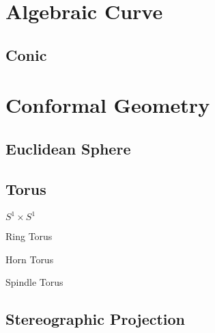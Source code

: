 


\section{Algebraic Curve}\label{sec:algebraic_curve}

\subsection{Conic}\label{sec:conic}



\section{Conformal Geometry}\label{sec:conformal_geometry}

\subsection{Euclidean Sphere}\label{sec:euclidean_sphere}

\subsection{Torus}\label{sec:torus}

$S^1 \times S^1$

Ring Torus

Horn Torus

Spindle Torus



\subsection{Stereographic Projection}\label{sec:stereographic_projection}


